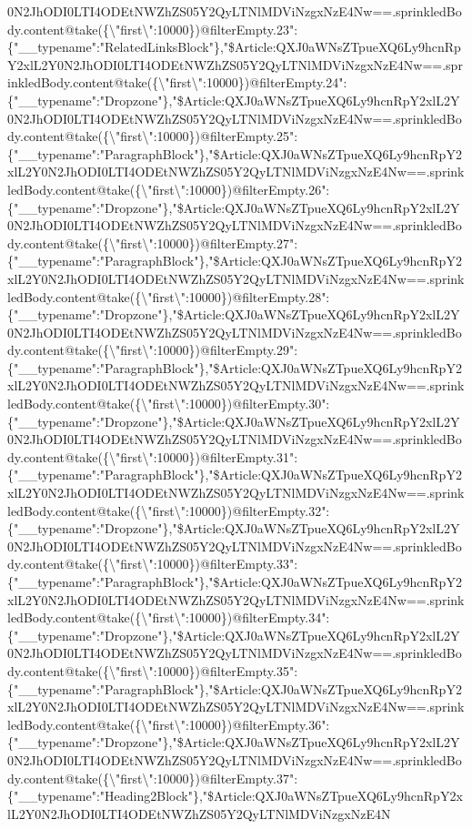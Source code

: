 0N2JhODI0LTI4ODEtNWZhZS05Y2QyLTNlMDViNzgxNzE4Nw==.sprinkledBody.content@take(\{\textbackslash{}"first\textbackslash{}":10000\})@filterEmpty.23":\{"\_\_typename":"RelatedLinksBlock"\},"\$Article:QXJ0aWNsZTpueXQ6Ly9hcnRpY2xlL2Y0N2JhODI0LTI4ODEtNWZhZS05Y2QyLTNlMDViNzgxNzE4Nw==.sprinkledBody.content@take(\{\textbackslash{}"first\textbackslash{}":10000\})@filterEmpty.24":\{"\_\_typename":"Dropzone"\},"\$Article:QXJ0aWNsZTpueXQ6Ly9hcnRpY2xlL2Y0N2JhODI0LTI4ODEtNWZhZS05Y2QyLTNlMDViNzgxNzE4Nw==.sprinkledBody.content@take(\{\textbackslash{}"first\textbackslash{}":10000\})@filterEmpty.25":\{"\_\_typename":"ParagraphBlock"\},"\$Article:QXJ0aWNsZTpueXQ6Ly9hcnRpY2xlL2Y0N2JhODI0LTI4ODEtNWZhZS05Y2QyLTNlMDViNzgxNzE4Nw==.sprinkledBody.content@take(\{\textbackslash{}"first\textbackslash{}":10000\})@filterEmpty.26":\{"\_\_typename":"Dropzone"\},"\$Article:QXJ0aWNsZTpueXQ6Ly9hcnRpY2xlL2Y0N2JhODI0LTI4ODEtNWZhZS05Y2QyLTNlMDViNzgxNzE4Nw==.sprinkledBody.content@take(\{\textbackslash{}"first\textbackslash{}":10000\})@filterEmpty.27":\{"\_\_typename":"ParagraphBlock"\},"\$Article:QXJ0aWNsZTpueXQ6Ly9hcnRpY2xlL2Y0N2JhODI0LTI4ODEtNWZhZS05Y2QyLTNlMDViNzgxNzE4Nw==.sprinkledBody.content@take(\{\textbackslash{}"first\textbackslash{}":10000\})@filterEmpty.28":\{"\_\_typename":"Dropzone"\},"\$Article:QXJ0aWNsZTpueXQ6Ly9hcnRpY2xlL2Y0N2JhODI0LTI4ODEtNWZhZS05Y2QyLTNlMDViNzgxNzE4Nw==.sprinkledBody.content@take(\{\textbackslash{}"first\textbackslash{}":10000\})@filterEmpty.29":\{"\_\_typename":"ParagraphBlock"\},"\$Article:QXJ0aWNsZTpueXQ6Ly9hcnRpY2xlL2Y0N2JhODI0LTI4ODEtNWZhZS05Y2QyLTNlMDViNzgxNzE4Nw==.sprinkledBody.content@take(\{\textbackslash{}"first\textbackslash{}":10000\})@filterEmpty.30":\{"\_\_typename":"Dropzone"\},"\$Article:QXJ0aWNsZTpueXQ6Ly9hcnRpY2xlL2Y0N2JhODI0LTI4ODEtNWZhZS05Y2QyLTNlMDViNzgxNzE4Nw==.sprinkledBody.content@take(\{\textbackslash{}"first\textbackslash{}":10000\})@filterEmpty.31":\{"\_\_typename":"ParagraphBlock"\},"\$Article:QXJ0aWNsZTpueXQ6Ly9hcnRpY2xlL2Y0N2JhODI0LTI4ODEtNWZhZS05Y2QyLTNlMDViNzgxNzE4Nw==.sprinkledBody.content@take(\{\textbackslash{}"first\textbackslash{}":10000\})@filterEmpty.32":\{"\_\_typename":"Dropzone"\},"\$Article:QXJ0aWNsZTpueXQ6Ly9hcnRpY2xlL2Y0N2JhODI0LTI4ODEtNWZhZS05Y2QyLTNlMDViNzgxNzE4Nw==.sprinkledBody.content@take(\{\textbackslash{}"first\textbackslash{}":10000\})@filterEmpty.33":\{"\_\_typename":"ParagraphBlock"\},"\$Article:QXJ0aWNsZTpueXQ6Ly9hcnRpY2xlL2Y0N2JhODI0LTI4ODEtNWZhZS05Y2QyLTNlMDViNzgxNzE4Nw==.sprinkledBody.content@take(\{\textbackslash{}"first\textbackslash{}":10000\})@filterEmpty.34":\{"\_\_typename":"Dropzone"\},"\$Article:QXJ0aWNsZTpueXQ6Ly9hcnRpY2xlL2Y0N2JhODI0LTI4ODEtNWZhZS05Y2QyLTNlMDViNzgxNzE4Nw==.sprinkledBody.content@take(\{\textbackslash{}"first\textbackslash{}":10000\})@filterEmpty.35":\{"\_\_typename":"ParagraphBlock"\},"\$Article:QXJ0aWNsZTpueXQ6Ly9hcnRpY2xlL2Y0N2JhODI0LTI4ODEtNWZhZS05Y2QyLTNlMDViNzgxNzE4Nw==.sprinkledBody.content@take(\{\textbackslash{}"first\textbackslash{}":10000\})@filterEmpty.36":\{"\_\_typename":"Dropzone"\},"\$Article:QXJ0aWNsZTpueXQ6Ly9hcnRpY2xlL2Y0N2JhODI0LTI4ODEtNWZhZS05Y2QyLTNlMDViNzgxNzE4Nw==.sprinkledBody.content@take(\{\textbackslash{}"first\textbackslash{}":10000\})@filterEmpty.37":\{"\_\_typename":"Heading2Block"\},"\$Article:QXJ0aWNsZTpueXQ6Ly9hcnRpY2xlL2Y0N2JhODI0LTI4ODEtNWZhZS05Y2QyLTNlMDViNzgxNzE4N